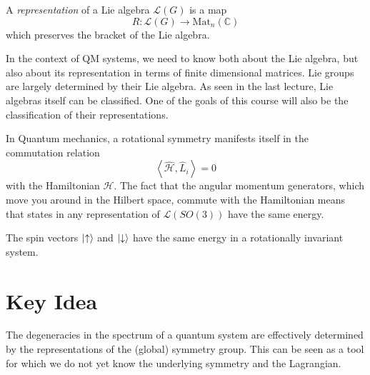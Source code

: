 \begin{definition}[Representation]
  A \emph{representation} of a Lie algebra $\mathscr{L}(G)$ is a map
  \begin{equation}
    R \colon \mathscr{L}(G) \to \text{Mat}_n (\mathbb{C})
  \end{equation}
  which preserves the bracket of the Lie algebra.
\end{definition}

\begin{leftbar}
  \begin{remark}
    In the context of QM systems, we need to know both about the Lie algebra, but also about its representation in terms of finite dimensional matrices.
    Lie groups are largely determined by their Lie algebra. As seen in the last lecture, Lie algebras itself can be classified. One of the goals of this course will also be the classification of their representations.
  \end{remark}
\end{leftbar}

In Quantum mechanics, a rotational symmetry manifests itself in the commutation relation
\begin{equation}
  \left\langle \hat{\mathcal{H}}, \hat L_i \right\rangle = 0
\end{equation}
with the Hamiltonian $\mathcal{H}$. The fact that the angular momentum generators, which move you around in the Hilbert space, commute with the Hamiltonian means that states in any representation of $\mathscr{L}(SO(3))$ have the same energy.

\begin{example}[]
The spin vectors $\ket{\uparrow}$ and $\ket{\downarrow}$ have the same energy in a rotationally invariant system.
\end{example}

\section{Key Idea}%
\label{sec:key_idea}

The degeneracies in the spectrum of a quantum system are effectively determined by the representations of the (global) symmetry group.
This can be seen as a tool for which we do not yet know the underlying symmetry and the Lagrangian.

